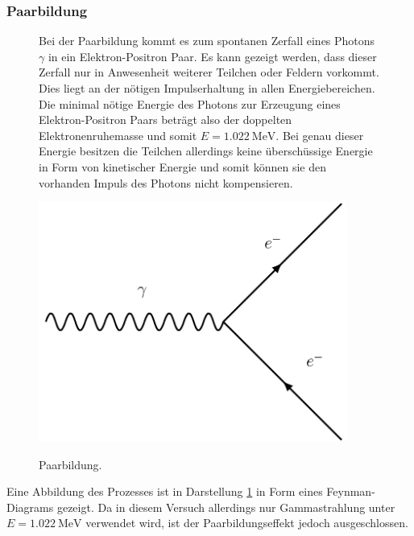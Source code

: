 \subsubsection{Paarbildung}
\begin{figure}
    \begin{minipage}{0.5\textwidth}
        Bei der Paarbildung kommt es zum spontanen Zerfall eines Photons $\gamma$ in ein Elektron-Positron Paar. Es kann gezeigt werden, dass dieser Zerfall nur in Anwesenheit weiterer Teilchen oder Feldern vorkommt. Dies liegt an der nötigen
        Impulserhaltung in allen Energiebereichen. Die minimal nötige Energie des Photons zur Erzeugung eines Elektron-Positron Paars beträgt also der doppelten Elektronenruhemasse und somit $E = \SI{1.022}{\mega\electronvolt}$. Bei genau dieser
        Energie besitzen die Teilchen allerdings keine überschüssige Energie in Form von kinetischer Energie und somit können sie den vorhanden Impuls des Photons nicht kompensieren.
    \end{minipage}
    \begin{minipage}{0.5\textwidth}
        \centering
        \includegraphics[width=0.9\textwidth]{bilder/paarbildung.pdf}
        \label{fig:lol1}
        \caption{Paarbildung.}
    \end{minipage}
    \end{figure}

Eine Abbildung des Prozesses ist in Darstellung \ref{fig:lol1} in Form eines
Feynman-Diagrams gezeigt. Da in diesem Versuch allerdings nur Gammastrahlung unter $E = \SI{1.022}{\mega\electronvolt}$ verwendet wird, ist der Paarbildungseffekt jedoch ausgeschlossen.
